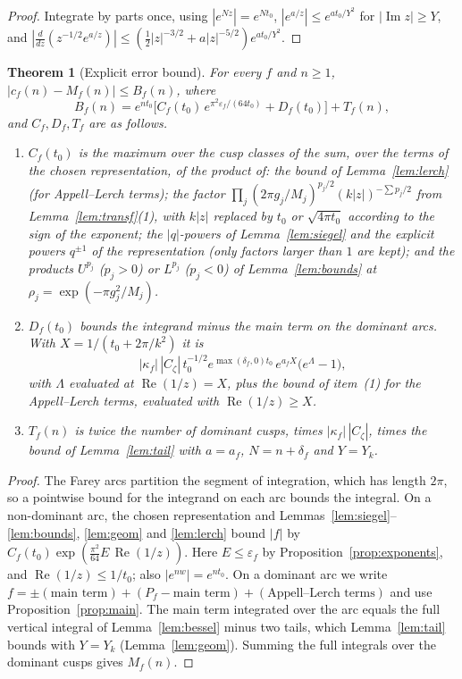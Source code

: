 \documentclass[11pt]{amsart}
\newtheorem{theorem}{Theorem}[section]
\theoremstyle{definition}
\theoremstyle{remark}
\numberwithin{equation}{section}
\newcommand{\re}{\operatorname{Re}}
\newcommand{\im}{\operatorname{Im}}
\begin{document}
\begin{proof}
Integrate by parts once, using $|e^{Nz}|=e^{Nt_0}$, $|e^{a/z}|\le e^{at_0/Y^2}$ for $|\im z|\ge Y$, and $|\frac{d}{dz}(z^{-1/2}e^{a/z})|\le(\frac12|z|^{-3/2}+a|z|^{-5/2})e^{at_0/Y^2}$.
\end{proof}

\begin{theorem}[Explicit error bound]\label{thm:explicit}
For every $f$ and $n\ge1$, $|c_f(n)-M_f(n)|\le B_f(n)$, where
\[
B_f(n)=e^{nt_0}\Big[C_f(t_0)\,e^{\pi^2\varepsilon_f/(64t_0)}+D_f(t_0)\Big]+T_f(n),
\]
and $C_f,D_f,T_f$ are as follows.
\begin{enumerate}
\item $C_f(t_0)$ is the maximum over the cusp classes of the sum, over the terms of the chosen representation, of the product of:
the bound of Lemma~\ref{lem:lerch} (for Appell--Lerch terms);
the factor $\prod_j(2\pi g_j/M_j)^{p_j/2}(k|z|)^{-\sum p_j/2}$ from Lemma~\ref{lem:transf}(1), with $k|z|$ replaced by $t_0$ or $\sqrt{4\pi t_0}$ according to the sign of the exponent;
the $|q|$-powers of Lemma~\ref{lem:siegel} and the explicit powers $q^{\pm1}$ of the representation (only factors larger than $1$ are kept);
and the products $U^{p_j}$ ($p_j>0$) or $L^{p_j}$ ($p_j<0$) of Lemma~\ref{lem:bounds} at $\rho_j=\exp(-\pi g_j^2/M_j)$.
\item $D_f(t_0)$ bounds the integrand minus the main term on the dominant arcs. With $X=1/(t_0+2\pi/k^2)$ it is
\[
|\kappa_f|\,|C_\zeta|\,t_0^{-1/2}e^{\max(\delta_f,0)t_0}\,e^{a_fX}\big(e^{\Lambda}-1\big),
\]
with $\Lambda$ evaluated at $\re(1/z)=X$, plus the bound of item~(1) for the Appell--Lerch terms, evaluated with $\re(1/z)\ge X$.
\item $T_f(n)$ is twice the number of dominant cusps, times $|\kappa_f|\,|C_\zeta|$, times the bound of Lemma~\ref{lem:tail} with $a=a_f$, $N=n+\delta_f$ and $Y=Y_k$.
\end{enumerate}
\end{theorem}

\begin{proof}
The Farey arcs partition the segment of integration, which has length $2\pi$, so a pointwise bound for the integrand on each arc bounds the integral.
On a non-dominant arc, the chosen representation and Lemmas~\ref{lem:siegel}--\ref{lem:bounds}, \ref{lem:geom} and \ref{lem:lerch} bound $|f|$ by $C_f(t_0)\exp(\frac{\pi^2}{64}E\,\re(1/z))$.
Here $E\le\varepsilon_f$ by Proposition~\ref{prop:exponents}, and $\re(1/z)\le1/t_0$; also $|e^{nw}|=e^{nt_0}$.
On a dominant arc we write $f=\pm(\text{main term})+(P_f-\text{main term})+(\text{Appell--Lerch terms})$ and use Proposition~\ref{prop:main}.
The main term integrated over the arc equals the full vertical integral of Lemma~\ref{lem:bessel} minus two tails, which Lemma~\ref{lem:tail} bounds with $Y=Y_k$ (Lemma~\ref{lem:geom}).
Summing the full integrals over the dominant cusps gives $M_f(n)$.
\end{proof}
\end{document}

